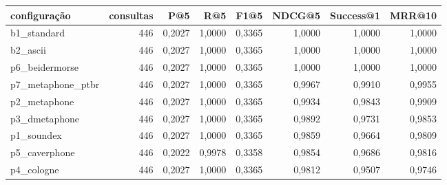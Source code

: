 \begin{tabular}{lrrrrrrr}
\hline
configuração & consultas & P@5 & R@5 & F1@5 & NDCG@5 & Success@1 & MRR@10 \\
\hline
b1\_standard & 446 & 0,2027 & 1,0000 & 0,3365 & 1,0000 & 1,0000 & 1,0000 \\
b2\_ascii & 446 & 0,2027 & 1,0000 & 0,3365 & 1,0000 & 1,0000 & 1,0000 \\
p6\_beidermorse & 446 & 0,2027 & 1,0000 & 0,3365 & 1,0000 & 1,0000 & 1,0000 \\
p7\_metaphone\_ptbr & 446 & 0,2027 & 1,0000 & 0,3365 & 0,9967 & 0,9910 & 0,9955 \\
p2\_metaphone & 446 & 0,2027 & 1,0000 & 0,3365 & 0,9934 & 0,9843 & 0,9909 \\
p3\_dmetaphone & 446 & 0,2027 & 1,0000 & 0,3365 & 0,9892 & 0,9731 & 0,9853 \\
p1\_soundex & 446 & 0,2027 & 1,0000 & 0,3365 & 0,9859 & 0,9664 & 0,9809 \\
p5\_caverphone & 446 & 0,2022 & 0,9978 & 0,3358 & 0,9854 & 0,9686 & 0,9816 \\
p4\_cologne & 446 & 0,2027 & 1,0000 & 0,3365 & 0,9812 & 0,9507 & 0,9746 \\
\hline
\end{tabular}